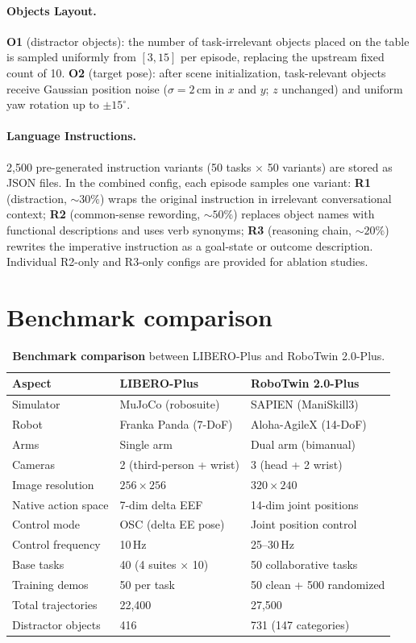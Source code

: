 \documentclass{article}
\begin{document}
\paragraph{Objects Layout.} \textbf{O1} (distractor objects): the number of task-irrelevant objects placed on the table is sampled uniformly from $[3, 15]$ per episode, replacing the upstream fixed count of 10. \textbf{O2} (target pose): after scene initialization, task-relevant objects receive Gaussian position noise ($\sigma = 2$\,cm in $x$ and $y$; $z$ unchanged) and uniform yaw rotation up to $\pm 15^\circ$.

\paragraph{Language Instructions.} 2{,}500 pre-generated instruction variants (50 tasks $\times$ 50 variants) are stored as JSON files. In the combined config, each episode samples one variant: \textbf{R1} (distraction, ${\sim}30\%$) wraps the original instruction in irrelevant conversational context; \textbf{R2} (common-sense rewording, ${\sim}50\%$) replaces object names with functional descriptions and uses verb synonyms; \textbf{R3} (reasoning chain, ${\sim}20\%$) rewrites the imperative instruction as a goal-state or outcome description. Individual R2-only and R3-only configs are provided for ablation studies.

\section{Benchmark comparison}

\label{app:bench_comp}
\begin{table}[h]
\caption{\textbf{Benchmark comparison} between LIBERO-Plus and RoboTwin 2.0-Plus.}
\label{tab:benchmark_comparison}
\centering
\begin{tabular}{@{}lll@{}}
\toprule
Aspect & LIBERO-Plus & RoboTwin 2.0-Plus \\ \midrule
Simulator & MuJoCo (robosuite) & SAPIEN (ManiSkill3) \\
Robot & Franka Panda (7-DoF) & Aloha-AgileX (14-DoF) \\
Arms & Single arm & Dual arm (bimanual) \\
Cameras & 2 (third-person + wrist) & 3 (head + 2 wrist) \\
Image resolution & $256\times256$ & $320\times240$ \\
Native action space & 7-dim delta EEF & 14-dim joint positions \\
Control mode & OSC (delta EE pose) & Joint position control \\
Control frequency & 10\,Hz & 25--30\,Hz \\
Base tasks & 40 (4 suites $\times$ 10) & 50 collaborative tasks \\
Training demos & 50 per task & 50 clean + 500 randomized \\
Total trajectories & 22,400 & 27,500 \\
Distractor objects & 416 & 731 (147 categories) \\
\bottomrule
\end{tabular}
\end{table}
\end{document}
